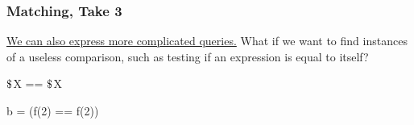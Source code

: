 \documentclass[aspectratio=169, handout]{beamer}
\newcommand{\dollar}{\mbox{\textdollar}}
\begin{document}
 \begin{frame}[fragile]
   \frametitle{Matching, Take 3}

   \begin{center}
     \begin{minipage}[t][0.21\textheight][t]{\textwidth}
       \raggedright
       {\color{blue}\href{https://semgrep.dev/playground/s/5rW33}{We can also express more complicated queries.}} What if we want to find instances
       of a useless comparison, such as testing if an expression is equal to itself?
     \end{minipage}
     \begin{minipage}[t][0.515\textheight][t]{\textwidth}
       \begin{minipage}{0.48\textwidth}
         \centering
       \end{minipage}
       \begin{minipage}{0.48\textwidth}
         \centering
       \end{minipage}
     \end{minipage}
     \begin{minipage}[t][0.3\textheight][t]{\textwidth}
       \begin{minipage}{0.48\textwidth}
         \centering
         \begin{codeblock}
           $\dollar$X == $\dollar$X
         \end{codeblock}
       \end{minipage}
       \begin{minipage}{0.48\textwidth}
         \begin{codeblock}
           b = (f(2) == f(2))
         \end{codeblock}
       \end{minipage}
     \end{minipage}
   \end{center}
 \end{frame}
\end{document}
